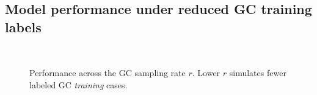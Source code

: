 \documentclass[diagnostics,article,submit,pdftex,moreauthors]{Definitions/mdpi}
\begin{document}
\subsection{Model performance under reduced GC training labels}
\begin{figure}[htbp]
\centering
{}
 \\
\caption{Performance across the GC sampling rate $r$. Lower $r$ simulates fewer labeled GC \emph{training} cases.\label{fig:model-gcrate}}
\end{figure}
\end{document}

